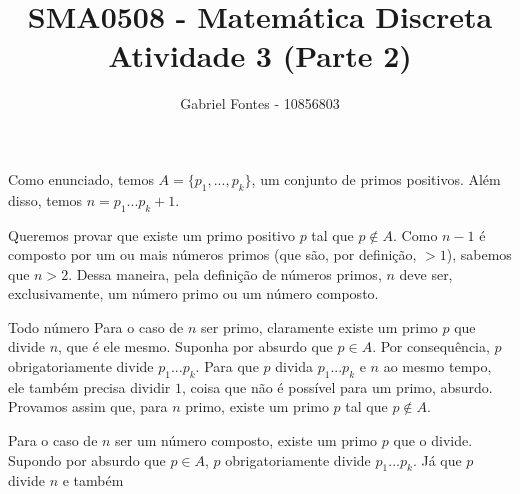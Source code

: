 \documentclass{article}
\title{SMA0508 - Matemática Discreta \\ Atividade 3 (Parte 2)}
\author{Gabriel Fontes - 10856803}
\begin{document}
\maketitle
Como enunciado, temos $A = \{p_1, ..., p_k\}$, um conjunto de primos positivos. Além disso, temos $n = p_1...p_k+1$.
\medskip

Queremos provar que existe um primo positivo $p$ tal que $p \notin A$.
Como $n-1$ é composto por um ou mais números primos (que são, por definição, $>1$), sabemos que $n > 2$. Dessa maneira, pela definição de números primos, $n$ deve ser, exclusivamente, um número primo ou um número composto.
\medskip

Todo número
Para o caso de $n$ ser primo, claramente existe um primo $p$ que divide $n$, que é ele mesmo. Suponha por absurdo que $p \in A$. Por consequência, $p$ obrigatoriamente divide $p_1...p_k$. Para que $p$ divida $p_1...p_k$ e $n$ ao mesmo tempo, ele também precisa dividir $1$, coisa que não é possível para um primo, absurdo.  Provamos assim que, para $n$ primo, existe um primo $p$ tal que $p \notin A$.

Para o caso de $n$ ser um número composto, existe um primo $p$ que o divide. Supondo por absurdo que $p \in A$, $p$ obrigatoriamente divide $p_1...p_k$. Já que $p$ divide $n$ e também 
\end{document}
